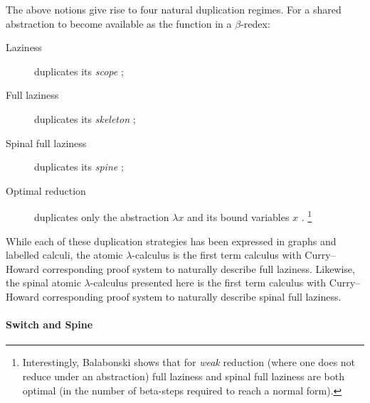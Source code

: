 \documentclass[a4paper,UKenglish,cleveref, autoref]{lipics-v2019}
\begin{document}
The above notions give rise to four natural duplication regimes. For a shared abstraction to become available as the function in a $\beta$-redex:
\begin{description}
\item[Laziness] duplicates its \emph{scope} \cite{Launchbury1993, ariolafelleisen1997};
\item[Full laziness] duplicates its \emph{skeleton} \cite{wadsworth1971semantics, Balabonski12, gundersen2013atomic};
\item[Spinal full laziness] duplicates its \emph{spine} \cite{Blanc2005, blanc2007sharing};
\item[Optimal reduction] duplicates only the abstraction $\lambda x$ and its bound variables $x$ \cite{lamping1989algorithm, van2004lambdascope}.%
\footnote{Interestingly, Balabonski \cite{Balabonski12} shows that for \emph{weak} reduction (where one does not reduce under an abstraction) full laziness and spinal full laziness are both optimal (in the number of beta-steps required to reach a normal form).}
\end{description}
While each of these duplication strategies has been expressed in graphs and labelled calculi, the atomic $\lambda$-calculus is the first term calculus with Curry--Howard corresponding proof system to naturally describe full laziness. Likewise, the spinal atomic $\lambda$-calculus presented here is the first term calculus with Curry--Howard corresponding proof system to naturally describe spinal full laziness.

\paragraph*{Switch and Spine}
\end{document}
